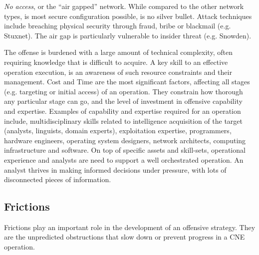 \documentclass[11pt]{report}
\begin{document}
\textit{No access}, or the ``air gapped'' network. While compared to the other network types, is most secure configuration possible, is no silver bullet. Attack techniques include breaching physical security through fraud, bribe or blackmail (e.g. Stuxnet). The air gap is particularly vulnerable to insider threat (e.g. Snowden).


The offense is burdened with a large amount of technical complexity, often requiring knowledge that is difficult to acquire. A key skill to an effective operation execution, is an awareness of such resource constraints and their management. Cost and Time are the most significant factors, affecting all stages (e.g. targeting or initial access) of an operation. They constrain how thorough any particular stage can go, and the level of investment in offensive capability and expertise. Examples of capability and expertise required for an operation include, multidisciplinary skills related to intelligence acquisition of the target (analysts, linguists, domain experts), exploitation expertise, programmers, hardware engineers, operating system designers, network architects, computing infrastructure and software. On top of specific assets and skill-sets, operational experience and analysts are need to support a well orchestrated operation. An analyst thrives in making informed decisions under pressure, with lots of disconnected pieces of information.



\subsection{Frictions}

Frictions play an important role in the development of an offensive strategy. They are the unpredicted obstructions that slow down or prevent progress in a CNE operation.
\end{document}
